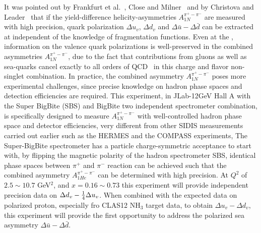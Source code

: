  It was  pointed out by Frankfurt et al.~\cite{LFrankfurt1989141}, Close and Milner~\cite{PhysRevD.44.3691} and by Christova and Leader~\cite{Christova:1999he, Christova:2000nz} that 
if the yield-difference  helicity-asymmetries $A_{1N}^{\pi^+ - \pi^-}$ are measured with  high precision,
quark polarization $\Delta u_v$, $\Delta d_v$ and $\Delta \bar{u} - \Delta \bar{d}$ can be extracted
at \lo independent of the knowledge of fragmentation functions.  Even 
at the \nloo, information on the 
valence quark polarizations is well-preserved in the combined 
asymmetries $A_{1N}^{\pi^+ - \pi^-}$, due to the fact that contributions from 
gluons as well as sea-quarks cancel exactly to all orders of QCD~\cite{Christova:2000nz} in this charge and flavor 
non-singlet combination.
In practice, the combined asymmetry $A_{1N}^{\pi^+ - \pi^-}$ poses more
experimental challenges, since precise knowledge on hadron phase spaces and detection 
efficiencies are required. This experiment,  in JLab-12GeV Hall A with the Super BigBite (SBS) and BigBite two independent spectrometer combination,  is specifically designed to measure $A_{1N}^{\pi^+ - \pi^-}$ with well-controlled hadron phase space and detector efficiencies,  
 very different from other SIDIS measurements carried out earlier such as  the HERMES and the  COMPASS experiments,
The Super-BigBite spectrometer has a particle charge-symmetric acceptance to start with,  
by flipping the magnetic 
polarity of the hadron spectrometer SBS, identical phase spaces between $\pi^+$ and $\pi^-$ 
reaction can be achieved such that the combined asymmetry $A_{1He}^{\pi^+ - \pi^-}$ can be 
determined with high precision.
At $Q^2$ of $2.5\sim 10.7$ GeV$^2$, and $x=0.16 \sim 0.73$  this experiment will 
provide independent precision data on $\Delta d_v -{1 \over 4} \Delta u_v$.
When combined with the expected data on polarized proton,  especially fro CLAS12 NH$_3$ target data,
to obtain $\Delta u_v - \Delta d_v$,
this experiment will provide the first 
opportunity to address the polarized sea asymmetry $\Delta \bar{u}- \Delta \bar{d}$. 

